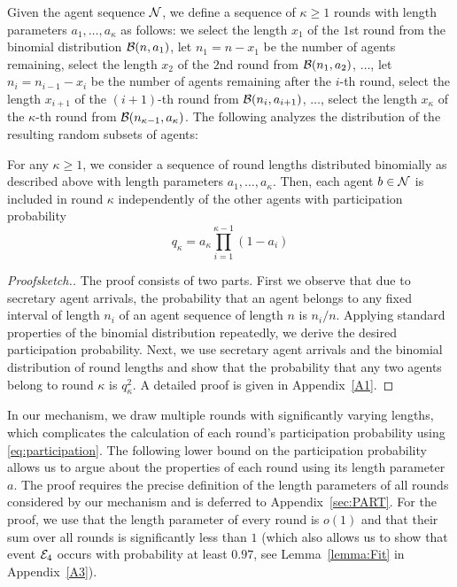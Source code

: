 Given the agent sequence $\mathcal{N}$, we define a sequence of $\kappa \geq 1$ rounds with length parameters $a_1, \ldots, a_\kappa$ as follows: we select the length $x_1$ of the $1$st round from the binomial distribution $\mathcal{B}(n, a_1)$, let $n_1 = n-x_1$ be the number of agents remaining, select the length $x_2$ of the $2$nd round from $\mathcal{B}(n_1, a_2)$, $\ldots$, let $n_i= n_{i-1}-x_i$ be the number of agents remaining after the $i$-th round, select the length $x_{i+1}$ of the $(i+1)$-th round from $\mathcal{B}(n_i, a_{i+1})$, $\ldots$, select the length $x_{\kappa}$ of the $\kappa$-th round from $\mathcal{B}(n_{\kappa-1}, a_{\kappa})$. The following analyzes the distribution of the resulting random subsets of agents: 

\begin{lemma}\label{lemma:RoundPro}
For any $\kappa \geq 1$, we consider a sequence of round lengths distributed binomially as described above with length parameters $a_1, \ldots, a_\kappa$. Then, each agent $b \in \mathcal{N}$ is included in round $\kappa$ independently of the other agents with participation probability
%
\begin{equation}\label{eq:participation}
                q_{\kappa} = a_{\kappa}\prod_{i=1}^{\kappa-1}(1-a_{i})
\end{equation}
\end{lemma}

\begin{proof}[Proofsketch.]
The proof consists of two parts. First we observe that due to secretary agent arrivals, the probability that an agent belongs to any fixed interval of length $n_i$ of an agent sequence of length $n$ is $n_i / n$. Applying standard properties of the binomial distribution repeatedly, we derive the desired participation probability. Next, we use secretary agent arrivals and the binomial distribution of round lengths and show that the probability that any two agents belong to round $\kappa$ is $q_\kappa^2$. 
%
%
A detailed proof is given in Appendix~\ref{A1}. 
\end{proof}

In our mechanism, we draw multiple rounds with significantly varying lengths, which complicates the calculation of each round's participation probability using \eqref{eq:participation}. The following lower bound on the participation probability allows us to argue about the properties of each round using its length parameter $a$. The proof requires the precise definition of the length parameters of all rounds considered by our mechanism and is deferred to Appendix~\ref{sec:PART}. For the proof, we use that the length parameter of every round is $o(1)$ and that their sum over all rounds is significantly less than $1$ (which also allows us to show that event $\mathcal{E}_4$ occurs with probability at least $0.97$, see Lemma~\ref{lemma:Fit} in Appendix~\ref{A3}).  

